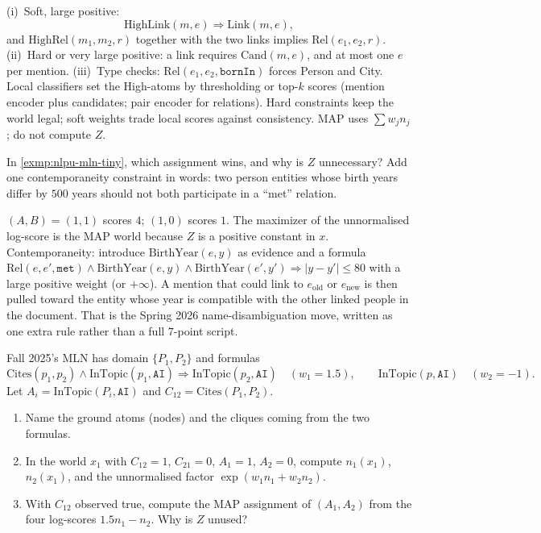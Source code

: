 \begin{solution}
(i)~Soft, large positive:
\[
\mathrm{HighLink}(m,e)\Rightarrow\mathrm{Link}(m,e),
\]
and $\mathrm{HighRel}(m_1,m_2,r)$ together with the two links implies $\mathrm{Rel}(e_1,e_2,r)$. (ii)~Hard or very large positive: a link requires $\mathrm{Cand}(m,e)$, and at most one $e$ per mention. (iii)~Type checks: $\mathrm{Rel}(e_1,e_2,\texttt{bornIn})$ forces Person and City. Local classifiers set the High-atoms by thresholding or top-$k$ scores (mention encoder plus candidates; pair encoder for relations). Hard constraints keep the world legal; soft weights trade local scores against consistency. MAP uses $\sum w_j n_j$; do not compute $Z$.
\end{solution}

\begin{exercise}
\label{ex:nlpu-mln-map}
In \cref{exmp:nlpu-mln-tiny}, which assignment wins, and why is $Z$ unnecessary? Add one contemporaneity constraint in words: two person entities whose birth years differ by $500$ years should not both participate in a ``met'' relation.
\end{exercise}

\begin{solution}
$(A,B)=(1,1)$ scores $4$; $(1,0)$ scores $1$. The maximizer of the unnormalised log-score is the MAP world because $Z$ is a positive constant in $x$. Contemporaneity: introduce $\mathrm{BirthYear}(e,y)$ as evidence and a formula $\mathrm{Rel}(e,e',\texttt{met})\wedge\mathrm{BirthYear}(e,y)\wedge\mathrm{BirthYear}(e',y')\Rightarrow\lvert y-y'\rvert\le 80$ with a large positive weight (or $+\infty$). A mention that could link to $e_{\mathrm{old}}$ or $e_{\mathrm{new}}$ is then pulled toward the entity whose year is compatible with the other linked people in the document. That is the Spring 2026 name-disambiguation move, written as one extra rule rather than a full $7$-point script.
\end{solution}

\begin{exercise}
\label{ex:nlpu-mln-fall}
Fall 2025's MLN has domain $\{P_1,P_2\}$ and formulas
\[
\mathrm{Cites}(p_1,p_2)\wedge\mathrm{InTopic}(p_1,\texttt{AI})\Rightarrow\mathrm{InTopic}(p_2,\texttt{AI})
\quad (w_1=1.5),
\qquad
\mathrm{InTopic}(p,\texttt{AI})
\quad (w_2=-1).
\]
Let $A_i=\mathrm{InTopic}(P_i,\texttt{AI})$ and $C_{12}=\mathrm{Cites}(P_1,P_2)$.
\begin{enumerate}[label=(\alph*)]
    \item Name the ground atoms (nodes) and the cliques coming from the two formulas.
    \item In the world $x_1$ with $C_{12}=1$, $C_{21}=0$, $A_1=1$, $A_2=0$, compute $n_1(x_1)$, $n_2(x_1)$, and the unnormalised factor $\exp(w_1 n_1+w_2 n_2)$.
    \item With $C_{12}$ observed true, compute the MAP assignment of $(A_1,A_2)$ from the four log-scores $1.5n_1-n_2$. Why is $Z$ unused?
\end{enumerate}
\end{exercise}

